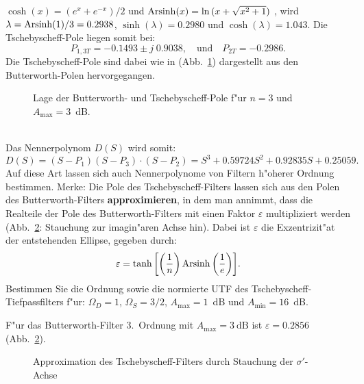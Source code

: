 $\cosh{(x)}=(e^{x}+e^{-x})/2$ und ${\rm
  Arsinh}(x)=\ln{(x+\sqrt{x^{2}+1})}$ \cite{BRO:SEM:91}, wird $\lambda={\rm
  Arsinh}(1)/3=0.2938$, $\sinh{(\lambda)}=0.2980$ und
$\cosh{(\lambda)}=1.043$. Die Tschebyscheff-Pole liegen somit bei:
\begin{equation*}
P_{1,3T}=-0.1493\pm j\;0.9038,\quad \text{und} \quad P_{2T}=-0.2986.
\end{equation*}
Die Tschebyscheff-Pole sind dabei wie in (Abb.~\ref{lage bw-t}) dargestellt
aus den Butterworth-Polen hervorgegangen.
\begin{figure}[!htb]%
\begin{center}
  \caption{Lage der Butterworth- und Tschebyscheff-Pole f"ur $n=3$ und $A_{\max}=3$~dB.\label{lage bw-t}}
\end{center}
\vspace*{-6mm} 
\end{figure}\\
Das Nennerpolynom $D(S)$ wird somit:
\begin{equation*}
D(S)=(S-P_{1})(S-P_{3})\cdot (S-P_{2})=S^{3}+0.59724 S^{2}+0.92835S +0.25059.
\end{equation*}
Auf diese Art lassen sich auch Nennerpolynome von Filtern
h"oherer Ordnung bestimmen.  Merke: Die Pole des Tschebyscheff-Filters
lassen sich aus den Polen des Butterworth-\-Filters {\bf approximieren},
in dem man annimmt, dass die Realteile der Pole des Butterworth-\-Filters mit einen Faktor
$\varepsilon$ multipliziert werden
(Abb.~\ref{approx T}: Stauchung zur imagin"aren Achse hin). Dabei ist $\varepsilon$ die Exzentrizit"at der
entstehenden Ellipse, gegeben durch:
\begin{equation*}
\varepsilon=\tanh{\left[\left(\frac{1}{n}\right){\rm Arsinh}\left(\frac{1}{e}\right)\right]}.
\end{equation*}
\aufg
Bestimmen Sie die Ordnung sowie die normierte UTF des Tschebyscheff-Tiefpass\-filters f"ur: $\Omega_D=1$, $\Omega_S=3/2$, $A_{\max}=1$~dB und $A_{\min}=16$~dB.\\ 
 

F"ur das Butterworth-Filter 3.~Ordnung mit $A_{\text{max}}=3~\text{dB}$ ist $\varepsilon=0.2856$ (Abb.~\ref{approx T}).
\begin{figure}[!htb]
\vspace*{-3mm}
\begin{center}
  \caption{Approximation des Tschebyscheff-Filters durch Stauchung der 
$\sigma'$-Achse \label{approx T}}
\end{center}
\vspace*{-6mm} 
\end{figure}

